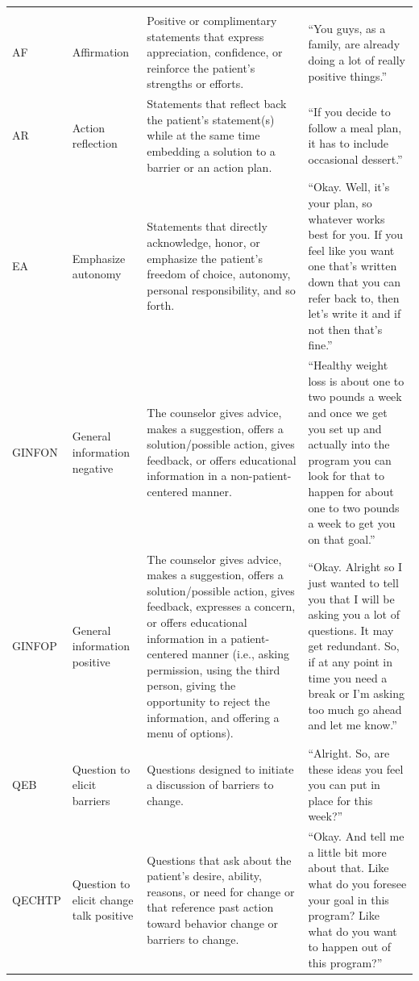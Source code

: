 \begin{small}
\begin{longtable}{p{1.3cm}p{2cm}p{5cm}p{4.8cm}}
\rowcolor{lightgraycol}
\noalign{\smallskip}
\multicolumn{4}{l}{\textbf{Counselor}} \\
\noalign{\smallskip}
AF & Affirmation & Positive or complimentary statements that express appreciation, confidence, or reinforce the patient's strengths or efforts. & ``You guys, as a family, are already doing a lot of really positive things.'' \\
AR & Action reflection & Statements that reflect back the patient's statement(s) while at the same time embedding a solution to a barrier or an action plan. & ``If you decide to follow a meal plan, it has to include occasional dessert.'' \\
EA & Emphasize autonomy & Statements that directly acknowledge, honor, or emphasize the patient's freedom of choice, autonomy, personal responsibility, and so forth. & ``Okay. Well, it's your plan, so whatever works best for you. If you feel like you want one that's written down that you can refer back to, then let's write it and if not then that's fine.''\\
GINFON & General information negative & The counselor gives advice, makes a suggestion, offers a solution/possible action, gives feedback, or offers educational information in a non-patient-centered manner. & ``Healthy weight loss is about one to two pounds a week and once we get you set up and actually into the program you can look for that to happen for about one to two pounds a week to get you on that goal.''\\
GINFOP & General information positive & The counselor gives advice, makes a suggestion, offers a solution/possible action, gives feedback, expresses a concern, or offers educational information in a patient-centered manner (i.e., asking permission, using the third person, giving the opportunity to reject the information, and offering a menu of options). & ``Okay.  Alright so I just wanted to tell you that I will be asking you a lot of questions.  It may get redundant.  So, if at any point in time you need a break or I'm asking too much go ahead and let me know.''\\
QEB & Question to elicit barriers & Questions designed to initiate a discussion of barriers to change. & ``Alright.  So, are these ideas you feel you can put in place for this week?''\\
QECHTP & Question to elicit change talk positive & Questions that ask about the patient's desire, ability, reasons, or need for change or that reference past action toward behavior change or barriers to change. & ``Okay.  And tell me a little bit more about that.  Like what do you foresee your goal in this program?  Like what do you want to happen out of this program?''\\

\end{longtable}
\end{small}

